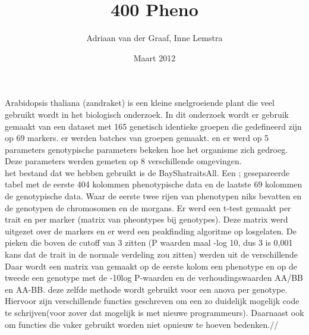 \documentclass[10pt]{article}
\author{Adriaan van der Graaf, Inne Lemstra}
\title{400 Pheno}
\date{Maart 2012}
\begin{document}
  \maketitle
Arabidopsis thaliana (zandraket) is een kleine snelgroeiende plant die veel gebruikt wordt in het biologisch onderzoek.
In dit onderzoek wordt er gebruik gemaakt van een dataset met 165 genetisch identieke groepen die gedefineerd zijn op 69 markers.
er werden batches van groepen gemaakt. en er werd op 5 parameters genotypische parameters bekeken hoe het organisme zich gedroeg.
Deze parameters werden gemeten op 8 verschillende omgevingen.\\

het bestand dat we hebben gebruikt is de BayShatraitsAll. 
Een ; gesepareerde tabel met de eerste 404 kolommen phenotypische data en de laatste 69 kolommen de genotypische data.
Waar de eerste twee rijen van phenotypen niks bevatten en de genotypen de chromosomen en de morgans.
Er werd een t-test gemaakt per trait en per marker (matrix van pheontypes bij genotypes).
Deze matrix werd uitgezet over de markers en er werd een peakfinding algoritme op losgelaten. 
De pieken die boven de cutoff van 3 zitten (P waarden maal -log 10, dus 3 is 0,001 kans dat de trait in de normale verdeling zou zitten)
werden uit de verschillende 
Daar wordt een matrix van gemaakt op de eerste kolom een phenotype en op de tweede een genotype met de -10log P-waarden en de  verhoudingswaarden AA/BB en AA-BB.
deze zelfde methode wordt gebruikt voor een anova per genotype. 
Hiervoor zijn verschillende functies geschreven om een zo duidelijk mogelijk code te schrijven(voor zover dat mogelijk is met nieuwe programmeurs).
Daarnaast ook om functies die vaker gebruikt worden niet opnieuw te hoeven bedenken.//
\end{document}
